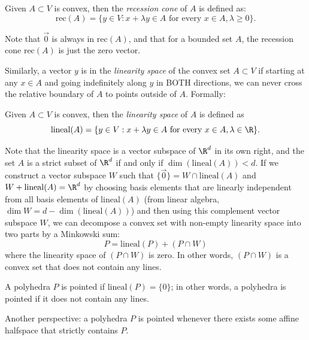 \documentclass{TC}
\begin{document}
\begin{definition}
Given $A \subset V$ is convex, then the \emph{recession cone} of $A$ is defined as:
$$ \mathrm{rec}(A) = \{y \in V: x + \lambda y \in A \text{ for every } x \in A, \lambda \geq 0\}.$$
\end{definition}


Note that $\vec 0$ is always in $\mathrm{rec}(A)$, and that for a bounded set $A$, the recession cone $\mathrm{rec}(A)$ is just the zero vector. 

Similarly, a vector $y$ is in the \emph{linearity space} of the convex set $A \subset V$ if starting at any $x \in A$ and going indefinitely along $y$ in BOTH directions, we can never cross the relative boundary of $A$ to points outside of $A$. Formally:

\begin{definition} 
Given $A \subset V$ is convex, then  the \emph{linearity space} of $A$ is defined as $$\mathrm{lineal}(A) = \{y \in V: x + \lambda y \in A \text{ for every } x \in A, \lambda \in \R\}.$$
\end{definition}

Note that the linearity space is a vector subspace of $\R^d$ in its own right, and the set $A$ is a strict subset of $\R^d$ if and only if $\dim(\mathrm{lineal}(A)) < d$. If we construct a vector subspace $W$ such that  $\{\vec 0\} = W \cap \mathrm{lineal}(A)$ and $W + \mathrm{lineal}(A) = \R^d$ by choosing basis elements that are linearly independent from all basis elements of $\mathrm{lineal}(A)$ (from linear algebra, $\dim W = d - \dim(\mathrm{lineal}(A))$) and then using this complement vector subspace $W$, we can decompose a convex set with non-empty linearity space into two parts by a Minkowski sum:
$$ P = \mathrm{lineal}(P) + (P \cap W)$$
where the linearity space of $(P \cap W)$ is zero. In other words, $(P \cap W)$ is a convex set that does not contain any lines. 

\begin{definition}
A polyhedra $P$ is pointed if $\mathrm{lineal}(P)=\{0\}$; in other words, a polyhedra is pointed if it does not contain any lines. 
\end{definition}

Another perspective: a polyhedra $P$ is pointed whenever there exists some affine halfspace that strictly contains $P$.
\end{document}
